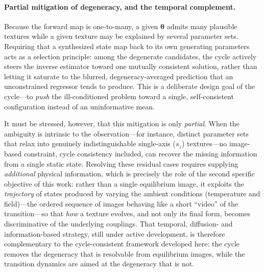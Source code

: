 \documentclass[letterpaper, 12, one column]{article}
\begin{document}
{\color[rgb]{0,0,1}\paragraph{Partial mitigation of degeneracy, and the temporal complement.}
Because the forward map is one-to-many, a given $\boldsymbol{\theta}$ admits many plausible textures while a given texture may be explained by several parameter sets. Requiring that a synthesized state map back to its own generating parameters acts as a selection principle: among the degenerate candidates, the cycle actively steers the inverse estimator toward one mutually consistent solution, rather than letting it saturate to the blurred, degeneracy-averaged prediction that an unconstrained regressor tends to produce. This is a deliberate design goal of the cycle---to \emph{push} the ill-conditioned problem toward a single, self-consistent configuration instead of an uninformative mean.

It must be stressed, however, that this mitigation is only \emph{partial}. When the ambiguity is intrinsic to the observation---for instance, distinct parameter sets that relax into genuinely indistinguishable single-axis ($s_z$) textures---no image-based constraint, cycle consistency included, can recover the missing information from a single static state. Resolving these residual cases requires supplying \emph{additional} physical information, which is precisely the role of the second specific objective of this work: rather than a single equilibrium image, it exploits the \emph{trajectory} of states produced by varying the ambient conditions (temperature and field)---the ordered sequence of images behaving like a short ``video'' of the transition---so that \emph{how} a texture evolves, and not only its final form, becomes discriminative of the underlying couplings. That temporal, diffusion- and information-based strategy, still under active development, is therefore complementary to the cycle-consistent framework developed here: the cycle removes the degeneracy that is resolvable from equilibrium images, while the transition dynamics are aimed at the degeneracy that is not.}
\end{document}

